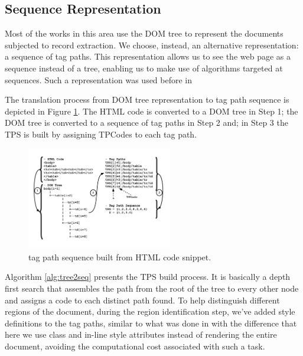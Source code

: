 
\subsection{Sequence Representation}\label{ss:seq}
Most of the works in this area use the DOM tree to represent the documents
subjected to record extraction. We choose, instead, an alternative
representation: a sequence of tag paths. This representation allows us to see
the web page as a sequence instead of a tree, enabling us to make use of
algorithms targeted at sequences. Such a representation was used before in
\cite{TPC09, SuffixTree12, TPS2013}

The translation process from DOM tree representation to tag path sequence is
depicted in Figure \ref{fig:tree2seq}. The HTML code is converted to a DOM tree
in Step 1; the DOM tree is converted to a sequence of tag paths in Step 2 and;
in Step 3 the TPS is built by assigning TPCodes to each tag path. 

\vspace{-0.3cm}

\begin{figure}[H]
  \centering
     \includegraphics[trim={1.5cm 2.5cm 1.5cm
     1.0cm}, width=180pt]{img/tree2seq.pdf}
  \caption{\small{tag path sequence built from HTML code snippet.}}
  \label{fig:tree2seq}
\end{figure}

\vspace{-0.3cm}

Algorithm \ref{alg:tree2seq} presents the TPS build process.
It is basically a depth first search that assembles the path from the root of
the tree to every other node and assigns a code to each distinct path found. To
help distinguish different regions of the document, during the region
identification step, we've added style definitions to the tag paths, similar to
what was done in \cite{grigalis2013towards} with the difference that here we use class
and in-line style attributes instead of rendering the entire document, avoiding
the computational cost associated with such a task.

